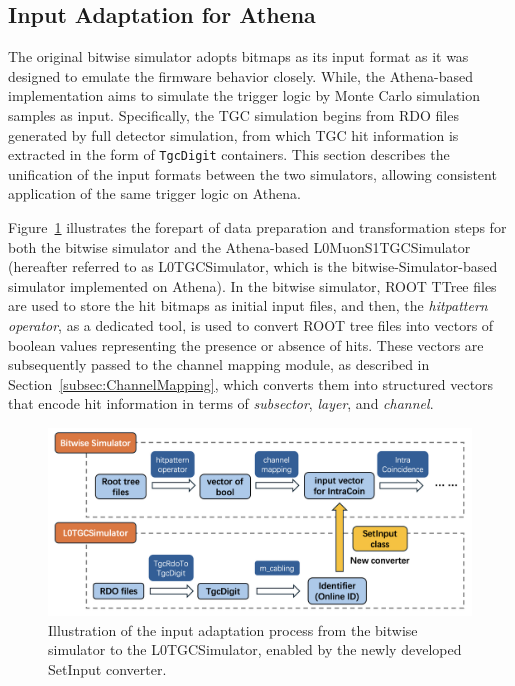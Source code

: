\subsection{Input Adaptation for Athena} \label{subsec:InputAdaptation}
The original bitwise simulator adopts bitmaps as its input format as it was designed to emulate the firmware behavior closely. While, the Athena-based implementation aims to simulate the trigger logic by Monte Carlo simulation samples as input. Specifically, the TGC simulation begins from RDO files generated by full detector simulation, from which TGC hit information is extracted in the form of \texttt{TgcDigit} containers. This section describes the unification of the input formats between the two simulators, allowing consistent application of the same trigger logic on Athena.

Figure~\ref{fig:input_adaptation} illustrates the forepart of data preparation and transformation steps for both the bitwise simulator and the Athena-based L0MuonS1TGCSimulator (hereafter referred to as L0TGCSimulator, which is the bitwise-Simulator-based simulator implemented on Athena). In the bitwise simulator, ROOT TTree files are used to store the hit bitmaps as initial input files, and then, the \textit{hitpattern operator}, as a dedicated tool, is used to convert ROOT tree files into vectors of boolean values representing the presence or absence of hits. These vectors are subsequently passed to the channel mapping module, as described in Section~\ref{subsec:ChannelMapping}, which converts them into structured vectors that encode hit information in terms of \textit{subsector}, \textit{layer}, and \textit{channel}.

\begin{figure}[htbp]
  \centering
  \includegraphics[width=1.0\textwidth]{figs/chapter5/input_adaptation.png}
  \caption{Illustration of the input adaptation process from the bitwise simulator to the L0TGCSimulator, enabled by the newly developed SetInput converter.}
  \label{fig:input_adaptation}
\end{figure}

